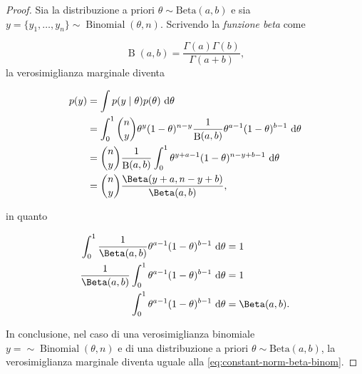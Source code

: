 \documentclass[
  11pt,
]{krantz}
\DeclareMathOperator{\Bin}{Binomial} %
\DeclareMathOperator{\B}{B} %
\theoremstyle{definition}
\theoremstyle{definition}
\theoremstyle{definition}
\theoremstyle{definition}
\theoremstyle{remark}
\begin{document}
\begin{proof}
Sia la distribuzione a priori \(\theta \sim \mbox{Beta}(a, b)\) e sia \(y = \{y_1, \dots, y_n\} \sim \Bin(\theta, n)\). Scrivendo la \emph{funzione beta} come

\[
\B(a, b) = \frac{\Gamma(a)\Gamma(b)}{\Gamma(a+b)},
\] la verosimiglianza marginale diventa

\begin{align}
p(y) &= \int p(y \mid \theta) p(\theta) \,\operatorname {d}\!\theta \notag\\
&= \int_0^1 \binom{n}{y}\theta^{y} (1 - \theta)^{n- y} \frac{1}{\B(a,b)} \theta^{a-1} (1-\theta)^{b-1} \,\operatorname {d}\!\theta \notag\\
&= \binom{n}{y}\frac{1}{\B(a,b)} \int_0^1 \theta^{y + a - 1} (1-\theta)^{n- y + b-1}  \,\operatorname {d}\!\theta \notag\\
&= \binom{n}{y}\frac{\Beta(y + a, n- y + b)}{\Beta(a,b)},
\label{eq:constant-norm-beta-binom}
\end{align}

in quanto

\begin{align}
\int_0^1 \frac{1}{\Beta(a,b)} \theta^{a-1} (1-\theta)^{b-1} \,\operatorname {d}\! \theta &= 1\notag\\
\frac{1}{\Beta(a,b)} \int_0^1  \theta^{a-1} (1-\theta)^{b-1} \,\operatorname {d}\! \theta &= 1\notag\\
\int_0^1  \theta^{a-1} (1-\theta)^{b-1} \,\operatorname {d}\!\theta &= \Beta(a,b). \notag
\end{align}

In conclusione, nel caso di una verosimiglianza binomiale \(y = \sim \Bin(\theta, n)\) e di una distribuzione a priori \(\theta \sim \mbox{Beta}(a, b)\), la verosimiglianza marginale diventa uguale alla \eqref{eq:constant-norm-beta-binom}.
\end{proof}
\end{document}
